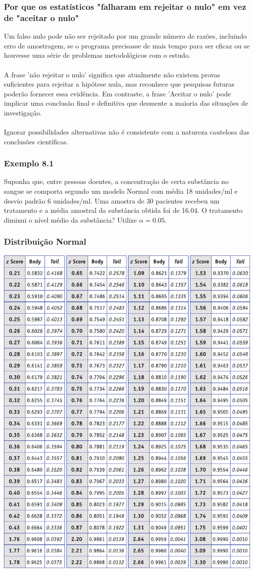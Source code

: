 \documentclass[11pt]{beamer}
\begin{document}
\begin{frame}
\frametitle{Por que os estatísticos "falharam em rejeitar o nulo" em vez de "aceitar o nulo"}
Um falso nulo pode não ser rejeitado por um grande número de razões, incluindo erro de amostragem, se o programa precisasse de mais tempo para ser eficaz ou se houvesse uma série de problemas metodológicos com o estudo.\\~\\ 

A frase 'não rejeitar o nulo' significa que atualmente não existem provas suficientes para rejeitar a hipótese nula, mas reconhece que pesquisas futuras poderão fornecer essa evidência. Em contraste, a frase 'Aceitar o nulo' pode implicar uma conclusão final e definitiva que desmente a maioria das situações de investigação.\\~\\

Ignorar possibilidades alternativas não é consistente com a natureza cautelosa das conclusões científicas.

\end{frame}

\begin{frame}
\frametitle{Exemplo 8.1}
Suponha que, entre pessoas doentes, a concentração de certa substância no sangue se comporta segundo um modelo Normal com média 18 unidades/ml e desvio padrão 6 unidades/ml. Uma amostra de 30 pacientes recebeu um tratamento e a média amostral da substância obtida foi de 16.04. O tratamento diminui o nível médio da substância? Utilize \(\alpha=0.05\).
\vspace{1in}
\vspace{1in}

\end{frame}

\begin{frame}
\frametitle{Distribuição Normal}

\begin{center}\includegraphics[width=0.5\linewidth]{figs/ztab_crop2} \end{center}
\end{frame}
\end{document}
